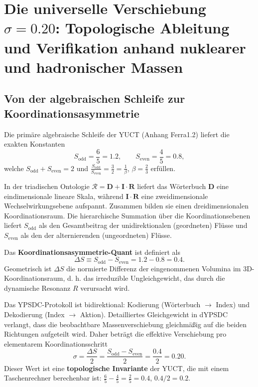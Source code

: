 \documentclass[11pt,a4paper]{article}
\theoremstyle{remark}
\begin{document}
	\section{Die universelle Verschiebung \(\sigma = 0.20\): Topologische Ableitung und Verifikation anhand nuklearer und hadronischer Massen}
	\label{sec:sigma}
	
	\subsection{Von der algebraischen Schleife zur Koordinationsasymmetrie}
	
	Die primäre algebraische Schleife der YUCT (Anhang Ferra1.2) liefert die exakten Konstanten
	\begin{equation}
		S_{\mathrm{odd}} = \frac{6}{5} = 1.2,\qquad S_{\mathrm{even}} = \frac{4}{5} = 0.8,
	\end{equation}
	welche \(\displaystyle S_{\mathrm{odd}}+S_{\mathrm{even}}=2\) und \(\displaystyle \frac{S_{\mathrm{odd}}}{S_{\mathrm{even}}}=\frac{3}{2}=\frac{1}{\beta}\), \(\beta=\frac{2}{3}\) erfüllen.
	
	In der triadischen Ontologie \(\mathcal{R}=\mathbf{D}+\mathbf{I}\!\cdot\!\mathbf{R}\) liefert das Wörterbuch \(\mathbf{D}\) eine eindimensionale lineare Skala, während \(\mathbf{I}\!\cdot\!\mathbf{R}\) eine zweidimensionale Wechselwirkungsebene aufspannt. Zusammen bilden sie einen dreidimensionalen Koordinationsraum. Die hierarchische Summation über die Koordinationsebenen liefert \(S_{\mathrm{odd}}\) als den Gesamtbeitrag der unidirektionalen (geordneten) Flüsse und \(S_{\mathrm{even}}\) als den der alternierenden (ungeordneten) Flüsse.
	
	Das \textbf{Koordinationsasymmetrie-Quant} ist definiert als
	\begin{equation}
		\Delta S \equiv S_{\mathrm{odd}} - S_{\mathrm{even}} = 1.2 - 0.8 = 0.4.
		\label{eq:DS}
	\end{equation}
	Geometrisch ist \(\Delta S\) die normierte Differenz der eingenommenen Volumina im 3D-Koordinationsraum, d. h. das irreduzible Ungleichgewicht, das durch die dynamische Resonanz \(R\) verursacht wird.
	
	Das YPSDC-Protokoll ist bidirektional: Kodierung (Wörterbuch \(\to\) Index) und Dekodierung (Index \(\to\) Aktion). Detailliertes Gleichgewicht in dYPSDC verlangt, dass die beobachtbare Massenverschiebung gleichmäßig auf die beiden Richtungen aufgeteilt wird. Daher beträgt die effektive Verschiebung pro elementarem Koordinationsschritt
	\begin{equation}
		\boxed{\sigma = \frac{\Delta S}{2} = \frac{S_{\mathrm{odd}} - S_{\mathrm{even}}}{2} = \frac{0.4}{2} = 0.20.}
		\label{eq:sigma}
	\end{equation}
	Dieser Wert ist eine \textbf{topologische Invariante} der YUCT, die mit einem Taschenrechner berechenbar ist: \(\frac{6}{5} - \frac{4}{5} = \frac{2}{5} = 0.4\), \(0.4/2 = 0.2\).
	
\end{document}
